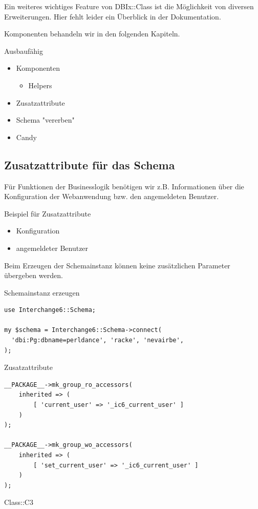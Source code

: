 Ein weiteres wichtiges Feature von DBIx::Class ist die Möglichkeit von
diversen Erweiterungen. Hier fehlt leider ein Überblick in der
Dokumentation.

Komponenten behandeln wir in den folgenden Kapiteln.

\begin{frame}{Ausbaufähig}
\begin{itemize}
\item Komponenten
  \begin{itemize}
  \item Helpers
  \end{itemize}
\item Zusatzattribute
\item Schema "vererben"
\item Candy
\end{itemize}
\end{frame}

\subsection{Zusatzattribute für das Schema}

Für Funktionen der Businesslogik benötigen wir z.B.
Informationen über die Konfiguration der Webanwendung
bzw. den angemeldeten Benutzer.

\begin{frame}{Beispiel für Zusatzattribute}
\begin{itemize}
\item Konfiguration
\item angemeldeter Benutzer
\end{itemize}
\end{frame}

Beim Erzeugen der Schemainstanz können keine zusätzlichen Parameter
übergeben werden.

\begin{frame}[fragile]{Schemainstanz erzeugen}
\begin{lstlisting}
use Interchange6::Schema;

my $schema = Interchange6::Schema->connect(
  'dbi:Pg:dbname=perldance', 'racke', 'nevairbe', 
);
\end{lstlisting}
\end{frame}

\begin{frame}[fragile]{Zusatzattribute}
\begin{lstlisting}
__PACKAGE__->mk_group_ro_accessors(
    inherited => (
        [ 'current_user' => '_ic6_current_user' ]
    )
);

__PACKAGE__->mk_group_wo_accessors(
    inherited => (
        [ 'set_current_user' => '_ic6_current_user' ]
    )
);
\end{lstlisting}

Class::C3
\end{frame}

